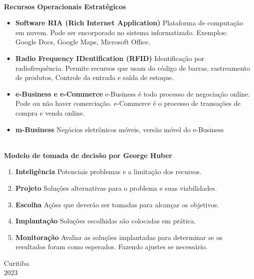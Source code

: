 \documentclass[12pt, a4paper]{article}
\begin{document}
\noindent
\textbf{\\Recursos Operacionais Estratégicos}
\begin{itemize}

    \item \textbf{Software RIA (Rich Internet Application)} Plataforma de computação em nuvem.
    Pode ser encorporado no sistema informatizado. Exemplos:
    Google Docs, Google Maps, Microsoft Office.

    \item \textbf{Radio Frequency IDentification (RFID)} Identificação por radiofrequência.
    Permite recursos que usam do código de barras, rastreamento de produtos,
    Controle da entrada e saída de estoque.
    \item \textbf{e-Business e e-Commerce}  e-Business é todo processo de negociação online.
    Pode ou não haver comerciação.
    e-Commerce é o processo de transações de compra e venda online.
\end{itemize}

\begin{itemize}
    \item \textbf{m-Business} Negócios eletrônicos móveis, versão móvel do e-Business
\end{itemize}

\newpage
\vspace*{0.5cm}

\noindent
\textbf{\\Modelo de tomada de decisão por George Huber}
\begin{enumerate}[label*=\textbf{\arabic*}.]
    \item \textbf{Inteligência} Potenciais problemas e a limitação dos recursos.
    \item \textbf{Projeto} Soluções alternativas para o problema e suas viabilidades.
    \item \textbf{Escolha} Ações que deverão ser tomadas para alcançar os objetivos.
    \item \textbf{Implantação} Soluções escolhidas são colocadas em prática.
    \item \textbf{Monitoração} Avaliar as soluções implantadas para determinar 
    se os resultados foram como esperados. Fazendo ajustes se necessário.
\end{enumerate} 

\vfill
\begin{center}
    Curitiba\\
    2023
\end{center}
\end{document}
